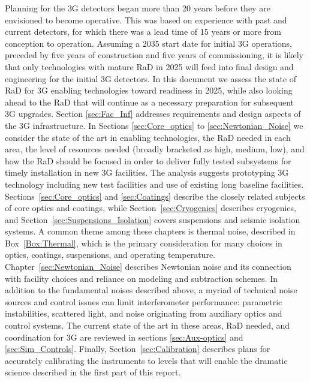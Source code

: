 Planning for the \ac{3G} detectors began more than 20 years before they are envisioned to become operative. 
This was based on experience with past and current detectors, for which there was a lead time of 15 years or more from conception to operation. 
Assuming a 2035 start date for initial \ac{3G} operations, preceded by five years of construction and five years of commissioning, it is likely that only technologies with mature \ac{RaD} in 2025 will feed into final design and engineering for the initial \ac{3G} detectors. In this document we assess the state of \ac{RaD} for \ac{3G} enabling technologies toward readiness in 2025, while also looking ahead to the \ac{RaD} that will continue as a necessary preparation for subsequent \ac{3G} upgrades. 
Section \ref{sec:Fac_Inf} addresses requirements and design aspects of the \ac{3G} infrastructure.
In Sections \ref{sec:Core_optics} to \ref{sec:Newtonian_Noise} we consider the state of the art in enabling technologies, the \ac{RaD} needed in each area, the level of resources needed (broadly bracketed as high, medium, low), and how the \ac{RaD} should be focused in order to deliver fully tested subsystems for timely installation in new \ac{3G} facilities. 
The analysis suggests prototyping \ac{3G} technology including new test facilities and use of existing long baseline facilities. 
Sections~\ref{sec:Core_optics} and \ref{sec:Coatings} describe the closely related subjects of core optics and coatings, while Section~\ref{sec:Cryogenics} describes cryogenics, and Section~\ref{sec:Suspensions_Isolation} covers suspensions and seismic isolation systems.
A common theme among these chapters is thermal noise, described in Box~\ref{Box:Thermal}, which is the primary consideration for many choices in optics, coatings, suspensions, and operating temperature. 
Chapter~\ref{sec:Newtonian_Noise} describes Newtonian noise and its connection with facility choices and reliance on modeling and subtraction schemes. 
In addition to the fundamental noises described above, a myriad of technical noise sources and control issues can limit interferometer performance: parametric instabilities, scattered light, and noise originating from auxiliary optics and control systems. 
The current state of the art in these areas, \ac{RaD} needed, and coordination for \ac{3G} are reviewed in sections \ref{sec:Aux-optics} and \ref{sec:Sim_Controls}. 
Finally, Section~\ref{sec:Calibration} describes plans for accurately calibrating the instruments to levels that will enable the dramatic science described in the first part of this report. 

